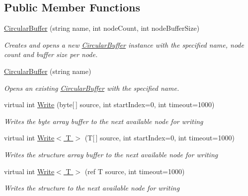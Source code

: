 \subsection*{Public Member Functions}
\begin{DoxyCompactItemize}
\item 
\hyperlink{class_shared_memory_1_1_circular_buffer_a50ab9ecafab3807e22fbadd32234830a}{Circular\+Buffer} (string name, int node\+Count, int node\+Buffer\+Size)
\begin{DoxyCompactList}\small\item\em Creates and opens a new \hyperlink{class_shared_memory_1_1_circular_buffer}{Circular\+Buffer} instance with the specified name, node count and buffer size per node. \end{DoxyCompactList}\item 
\hyperlink{class_shared_memory_1_1_circular_buffer_aa701a9a1a0ce4daa043e45c803bfcbde}{Circular\+Buffer} (string name)
\begin{DoxyCompactList}\small\item\em Opens an existing \hyperlink{class_shared_memory_1_1_circular_buffer}{Circular\+Buffer} with the specified name. \end{DoxyCompactList}\item 
virtual int \hyperlink{class_shared_memory_1_1_circular_buffer_a988b37e45afb8a8576041ed350407a0a}{Write} (byte\mbox{[}$\,$\mbox{]} source, int start\+Index=0, int timeout=1000)
\begin{DoxyCompactList}\small\item\em Writes the byte array buffer to the next available node for writing \end{DoxyCompactList}\item 
virtual int \hyperlink{class_shared_memory_1_1_circular_buffer_a588d16fbdffec14ee4d5e962ffae9bbf}{Write$<$ T $>$} (T\mbox{[}$\,$\mbox{]} source, int start\+Index=0, int timeout=1000)
\begin{DoxyCompactList}\small\item\em Writes the structure array buffer to the next available node for writing \end{DoxyCompactList}\item 
virtual int \hyperlink{class_shared_memory_1_1_circular_buffer_a73580b2c9e51472d9e9561c532c392d4}{Write$<$ T $>$} (ref T source, int timeout=1000)
\begin{DoxyCompactList}\small\item\em Writes the structure to the next available node for writing \end{DoxyCompactList}\item 

\end{DoxyCompactItemize}
